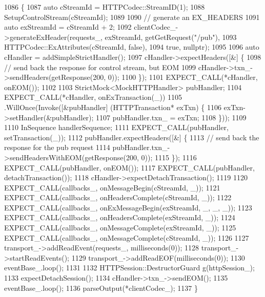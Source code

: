 \begin{DoxyCode}
1086                                                        \{
1087   \textcolor{keyword}{auto} cStreamId = HTTPCodec::StreamID(1);
1088   SetupControlStream(cStreamId);
1089 
1090   \textcolor{comment}{// generate an EX\_HEADERS}
1091   \textcolor{keyword}{auto} exStreamId = cStreamId + 2;
1092   clientCodec\_->generateExHeader(requests\_, exStreamId, getGetRequest(\textcolor{stringliteral}{"/pub"}),
1093                                  HTTPCodec::ExAttributes(cStreamId, \textcolor{keyword}{false}),
1094                                  \textcolor{keyword}{true}, \textcolor{keyword}{nullptr});
1095 
1096   \textcolor{keyword}{auto} cHandler = addSimpleStrictHandler();
1097   cHandler->expectHeaders([&] \{
1098       \textcolor{comment}{// send back the response for control stream, but EOM}
1099       cHandler->txn\_->sendHeaders(getResponse(200, 0));
1100     \});
1101   EXPECT\_CALL(*cHandler, onEOM());
1102 
1103   StrictMock<MockHTTPHandler> pubHandler;
1104   EXPECT\_CALL(*cHandler, onExTransaction(\_))
1105     .WillOnce(Invoke([&pubHandler] (HTTPTransaction* exTxn) \{
1106           exTxn->setHandler(&pubHandler);
1107           pubHandler.txn\_ = exTxn;
1108         \}));
1109 
1110   InSequence handlerSequence;
1111   EXPECT\_CALL(pubHandler, setTransaction(\_));
1112   pubHandler.expectHeaders([&] \{
1113       \textcolor{comment}{// send back the response for the pub request}
1114       pubHandler.txn\_->sendHeadersWithEOM(getResponse(200, 0));
1115     \});
1116   EXPECT\_CALL(pubHandler, onEOM());
1117   EXPECT\_CALL(pubHandler, detachTransaction());
1118   cHandler->expectDetachTransaction();
1119 
1120   EXPECT\_CALL(callbacks\_, onMessageBegin(cStreamId, \_));
1121   EXPECT\_CALL(callbacks\_, onHeadersComplete(cStreamId, \_));
1122   EXPECT\_CALL(callbacks\_, onExMessageBegin(exStreamId, \_, \_, \_));
1123   EXPECT\_CALL(callbacks\_, onHeadersComplete(exStreamId, \_));
1124   EXPECT\_CALL(callbacks\_, onMessageComplete(exStreamId, \_));
1125   EXPECT\_CALL(callbacks\_, onMessageComplete(cStreamId, \_));
1126 
1127   transport\_->addReadEvent(requests\_, milliseconds(0));
1128   transport\_->startReadEvents();
1129   transport\_->addReadEOF(milliseconds(0));
1130   eventBase\_.loop();
1131 
1132   HTTPSession::DestructorGuard g(httpSession\_);
1133   expectDetachSession();
1134   cHandler->txn\_->sendEOM();
1135   eventBase\_.loop();
1136   parseOutput(*clientCodec\_);
1137 \}
\end{DoxyCode}
